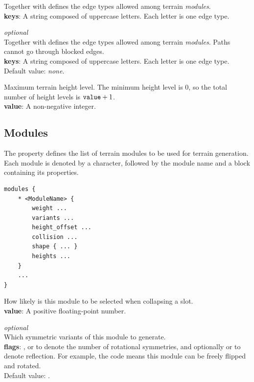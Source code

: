 Together with  defines the edge types allowed among terrain \emph{modules}.\\
\textbf{keys}: A string composed of uppercase letters. Each letter is one edge type.

\emph{optional}\\
Together with  defines the edge types allowed among terrain \emph{modules}.
Paths cannot go through blocked edges.\\
\textbf{keys}: A string composed of uppercase letters. Each letter is one edge type.\\
Default value: \emph{none}.

Maximum terrain height level.
The minimum height level is 0, so the total number of height levels is $\texttt{value} + 1$.\\
\textbf{value}: A non-negative integer.

\subsection{Modules}

The  property defines the list of terrain modules to be used for terrain generation.
Each module is denoted by a \mono{*} character, followed by the module name and a block containing its properties.

\begin{verbatim}
modules {
    * <ModuleName> {
        weight ...
        variants ...
        height_offset ...
        collision ...
        shape { ... }
        heights ...
    }
    ...
}
\end{verbatim}

How likely is this module to be selected when collapsing a slot.\\
\textbf{value}: A positive floating-point number.

\emph{optional}\\
Which symmetric variants of this module to generate.\\
\textbf{flags}: ,  or  to denote the number of rotational symmetries, and optionally  or  to denote reflection.
For example, the code  means this module can be freely flipped and rotated.\\
Default value: .

